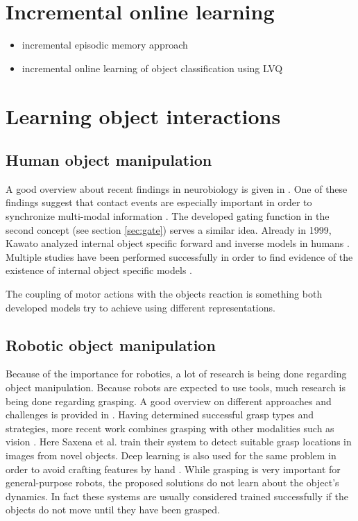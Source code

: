 \section{Incremental online learning}

\begin{itemize}
\item \cite{roboticEpisodes} incremental episodic memory approach
\item \cite{losing2015interactive} incremental online learning of object classification using LVQ

\end{itemize}


\section{Learning object interactions}

\subsection{Human object manipulation}

A good overview about recent findings in neurobiology is given in \cite{flanagan2006control}. One of these findings suggest that contact events are especially important in order to synchronize multi-modal information \cite{johansson2001eye}. The developed gating function in the second concept (see section \ref{sec:gate}) serves a similar idea. 
Already in 1999, Kawato analyzed internal object specific forward and inverse models in humans \cite{kawato1999internal}. Multiple studies have been performed successfully in order to find evidence of the existence of internal object specific models \cite{flanagan2001sensorimotor, merfeld1999humans}.


The coupling of motor actions with the objects reaction is something both developed models try to achieve using different representations.

\subsection{Robotic object manipulation}

Because of the importance for robotics, a lot of research is being done regarding object manipulation. Because robots are expected to use tools, much research is being done regarding grasping. A good overview on different approaches and challenges is provided in \cite{graspingReview}. Having determined successful grasp types and strategies, more recent work combines grasping with other modalities such as vision \cite{graspingVision}. Here Saxena et al. train their system to detect suitable grasp locations in images from novel objects.
Deep learning is also used for the same problem in order to avoid crafting features by hand \cite{graspingDeep}. 
While grasping is very important for general-purpose robots, the proposed solutions do not learn about the object's dynamics. In fact these systems are usually considered trained successfully if the objects do not move until they have been grasped.

